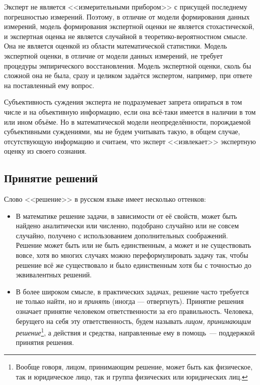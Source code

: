 Эксперт не является <<измерительными прибором>> с присущей последнему погрешностью измерений. Поэтому, в отличие от модели формирования данных измерений, модель формирования экспертной оценки не является стохастической, и экспертная оценка не является случайной в теоретико-вероятностном смысле. Она не является оценкой из области математической статистики. Модель экспертной оценки, в отличие от модели данных измерений, не требует процедуры эмпирического восстановления. Модель экспертной оценки, сколь бы сложной она не была, сразу и целиком задаётся экспертом, например, при ответе на поставленный ему вопрос.
 
Субъективность суждения эксперта не подразумевает запрета опираться в том числе и на объективную информацию, если она всё-таки имеется в наличии в том или ином объёме. Но в математической модели неопределённости, порождаемой субъективными суждениями, мы не будем учитывать такую, в общем случае, отсутствующую информацию и считаем, что эксперт <<извлекает>> экспертную оценку из своего сознания. 


\subsection{Принятие решений}
\label{sec:intro_decision}

Слово <<решение>> в русском языке имеет несколько оттенков: 
\begin{itemize}
  \item В математике решение задачи, в зависимости от её свойств, может быть найдено аналитически или численно, подобрано случайно или не совсем случайно, получено с использованием дополнительных соображений. Решение может быть или не быть единственным, а может и не существовать вовсе,  хотя во многих случаях можно переформулировать задачу так, чтобы решение всё же существовало и было единственным хотя бы с точностью до эквивалентных решений. 
  \item В более широком смысле, в практических задачах, решение часто требуется не только найти, но и {\sl принять} (иногда --- отвергнуть). Принятие решения означает принятие человеком ответственности за его правильность. Человека, берущего на себя эту ответственность, будем называть {\sl лицом, принимающим решение}\footnote{Вообще говоря, лицом, принимающим решение, может быть как физическое, так и юридическое лицо, так и группа физических или юридических лиц.}, а действия и средства, направленные ему в помощь~--- поддержкой принятия решения. 
\end{itemize}

